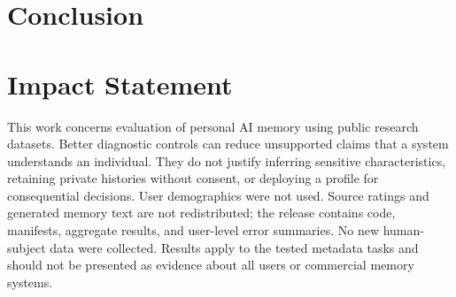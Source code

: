 \documentclass{article}
\begin{document}
\section{Conclusion}


\section*{Impact Statement}
This work concerns evaluation of personal AI memory using public research datasets. Better diagnostic controls can reduce unsupported claims that a system understands an individual. They do not justify inferring sensitive characteristics, retaining private histories without consent, or deploying a profile for consequential decisions. User demographics were not used. Source ratings and generated memory text are not redistributed; the release contains code, manifests, aggregate results, and user-level error summaries. No new human-subject data were collected. Results apply to the tested metadata tasks and should not be presented as evidence about all users or commercial memory systems.


\ifdefined\tmlrcopy\else\fi
\clearpage
\appendix

\end{document}
